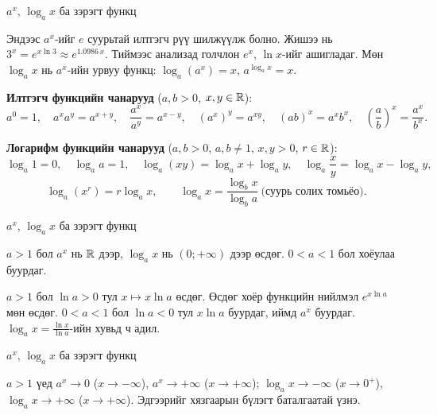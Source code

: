 \begin{frame}[allowframebreaks]{$a^x$, $\log_a x$ ба зэрэгт функц}
\begin{remark}
Эндээс $a^x$-ийг $e$ суурьтай илтгэгч рүү шилжүүлж болно. Жишээ нь
$3^x=e^{x\ln3}\approx e^{1.0986\,x}$. Тиймээс анализад голчлон $e^x$, $\ln x$-ийг ашигладаг.
Мөн $\log_a x$ нь $a^x$-ийн урвуу функц: $\log_a(a^x)=x$, \; $a^{\log_a x}=x$.
\end{remark}

\textbf{Илтгэгч функцийн чанарууд} ($a,b>0$, $x,y\in\mathbb{R}$):
\[
a^0=1,\quad a^xa^y=a^{x+y},\quad \frac{a^x}{a^y}=a^{x-y},\quad (a^x)^y=a^{xy},\quad
(ab)^x=a^xb^x,\quad \left(\frac ab\right)^x=\frac{a^x}{b^x}.
\]

\textbf{Логарифм функцийн чанарууд} ($a,b>0$, $a,b\neq1$, $x,y>0$, $r\in\mathbb{R}$):
\[
\log_a1=0,\quad \log_aa=1,\quad \log_a(xy)=\log_ax+\log_ay,\quad
\log_a\frac xy=\log_ax-\log_ay,
\]
\[
\log_a(x^r)=r\log_ax,\qquad \log_ax=\frac{\log_bx}{\log_ba}\ \text{(суурь солих томьёо)}.
\]
\end{frame}

\begin{frame}[allowframebreaks]{$a^x$, $\log_a x$ ба зэрэгт функц}
\begin{theorem}
$a>1$ бол $a^x$ нь $\mathbb{R}$ дээр, $\log_ax$ нь $(0;+\infty)$ дээр өсдөг.
$0<a<1$ бол хоёулаа буурдаг.
\end{theorem}
\begin{prof}
$a>1$ бол $\ln a>0$ тул $x\mapsto x\ln a$ өсдөг. Өсдөг хоёр функцийн нийлмэл
$e^{x\ln a}$ мөн өсдөг. $0<a<1$ бол $\ln a<0$ тул $x\ln a$ буурдаг, иймд $a^x$ буурдаг.
$\log_ax=\frac{\ln x}{\ln a}$-ийн хувьд ч адил.
\end{prof}
\end{frame}

\begin{frame}[allowframebreaks]{$a^x$, $\log_a x$ ба зэрэгт функц}
\begin{remark}
$a>1$ үед $a^x\to0$ ($x\to-\infty$), $a^x\to+\infty$ ($x\to+\infty$);
$\log_ax\to-\infty$ ($x\to0^+$), $\log_ax\to+\infty$ ($x\to+\infty$).
Эдгээрийг хязгаарын бүлэгт баталгаатай үзнэ.
\end{remark}
\end{frame}

